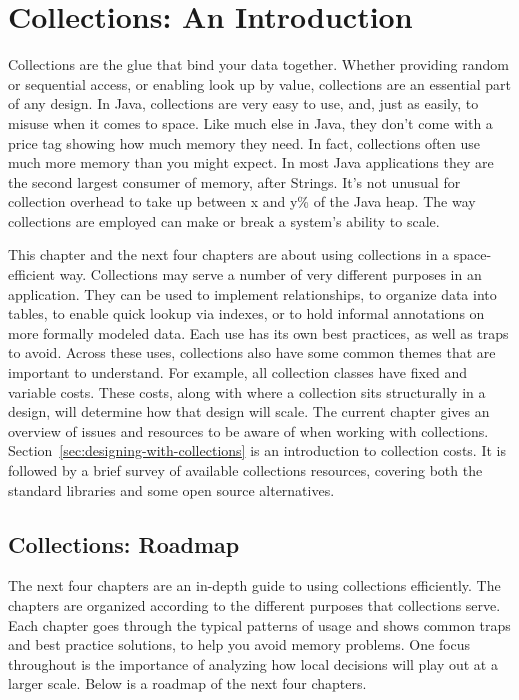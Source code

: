 \chapter{Collections: An Introduction}
\label{chapter:brief-introduction-collections}

Collections are the glue that bind your data together.  Whether 
providing random or sequential access, or enabling
look up by value, collections are an essential part of any
design. In Java, collections are very easy to use, and, just as easily, to misuse when
it comes to space. Like much else in Java, they don't come with a price tag
showing how much memory they need. In fact, collections
often use much more memory than you might expect. In most Java applications they are the second largest consumer of memory, after
Strings. It's not unusual for collection overhead to take up between x and y\%
of the Java heap. The way collections are employed can make
or break a system's ability to scale.


This chapter and the next four chapters are about using
collections in a space-efficient way.  Collections may serve a number of very
different purposes in an application. They can be used to implement relationships, to organize data into tables,
to enable quick lookup via indexes, or to hold informal annotations on more formally modeled data. Each use
has its own best practices, as well as traps to avoid. Across these
uses, collections also have some common themes that are important to understand. For example,
all collection classes have fixed and variable costs.
These costs, along with where a collection sits structurally in a design, will determine how that
design will scale. The current chapter gives an overview of issues and
resources to be aware of when working with collections. Section~\ref{sec:designing-with-collections}
is an introduction to collection costs. It is followed by a
brief survey of available collections resources, covering both the standard libraries and
some open source alternatives.

\section{Collections: Roadmap}
The next four chapters are an in-depth guide to using collections efficiently. 
The chapters are organized according to the
different purposes that collections serve. Each chapter goes through the typical
patterns of usage and shows common traps and best practice solutions, to help
you avoid memory problems. One focus throughout is the importance of analyzing
how local decisions will play out at a larger scale. Below is a roadmap of the next four chapters.
%

